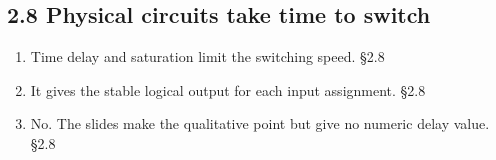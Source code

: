 \documentclass[11pt]{article}
\begin{document}
\begin{keepsection}\subsection{2.8 Physical circuits take time to switch}

\begin{enumerate}
\item Time delay and saturation limit the switching speed. \hfill{\small\color{FAUblue}§2.8}
\item It gives the stable logical output for each input assignment. \hfill{\small\color{FAUblue}§2.8}
\item No. The slides make the qualitative point but give no numeric delay value. \hfill{\small\color{FAUblue}§2.8}
\end{enumerate}

\end{keepsection}
\end{document}
